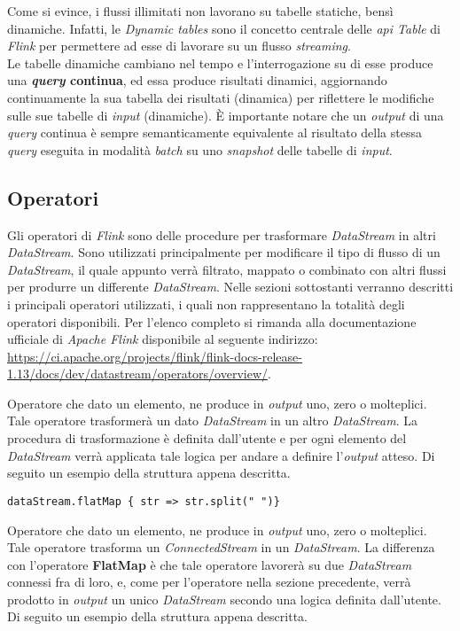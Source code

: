 Come si evince, i flussi illimitati non lavorano su tabelle statiche, bensì dinamiche. Infatti, le \textit{Dynamic tables} sono il concetto centrale delle \textit{\textit{\gls{api}} Table} di \textit{Flink} per permettere ad esse di lavorare su un flusso \textit{streaming}.\\
Le tabelle dinamiche cambiano nel tempo e l'interrogazione su di esse produce una \textbf{\textit{\gls{query}} continua}, ed essa produce risultati dinamici, aggiornando continuamente la sua tabella dei risultati (dinamica) per riflettere le modifiche sulle sue tabelle di \textit{input} (dinamiche). È importante notare che un \textit{output} di una \textit{\gls{query}} continua è sempre semanticamente equivalente al risultato della stessa \textit{\gls{query}} eseguita in modalità \textit{batch} su uno \textit{\gls{snapshot}} delle tabelle di \textit{input}.



\subsection{Operatori}\label{sec:operatori}
Gli operatori di \textit{Flink} sono delle procedure per trasformare \textit{DataStream} in altri \textit{DataStream}. Sono utilizzati principalmente per modificare il tipo di flusso di un \textit{DataStream}, il quale appunto verrà filtrato, mappato o combinato con altri flussi per produrre un differente \textit{DataStream}. Nelle sezioni sottostanti verranno descritti i principali operatori utilizzati, i quali non rappresentano la totalità degli operatori disponibili. Per l'elenco completo si rimanda alla documentazione ufficiale di \textit{Apache Flink} disponibile al seguente indirizzo: \url{https://ci.apache.org/projects/flink/flink-docs-release-1.13/docs/dev/datastream/operators/overview/}.

Operatore che dato un elemento, ne produce in \textit{output} uno, zero o molteplici. Tale operatore trasformerà un dato \textit{DataStream} in un altro \textit{DataStream}. La procedura di trasformazione è definita dall'utente e per ogni elemento del \textit{DataStream} verrà applicata tale logica per andare a definire l'\textit{output} atteso. Di seguito un esempio della struttura appena descritta.

\begin{verbatim}
dataStream.flatMap { str => str.split(" ")}
\end{verbatim}
	
	
Operatore che dato un elemento, ne produce in \textit{output} uno, zero o molteplici. Tale operatore trasforma un \textit{ConnectedStream} in un \textit{DataStream}. La differenza con l'operatore \textbf{FlatMap} è che tale operatore lavorerà su due \textit{DataStream} connessi fra di loro, e, come per l'operatore nella sezione precedente, verrà prodotto in \textit{output} un unico \textit{DataStream} secondo una logica definita dall'utente. Di seguito un esempio della struttura appena descritta.

